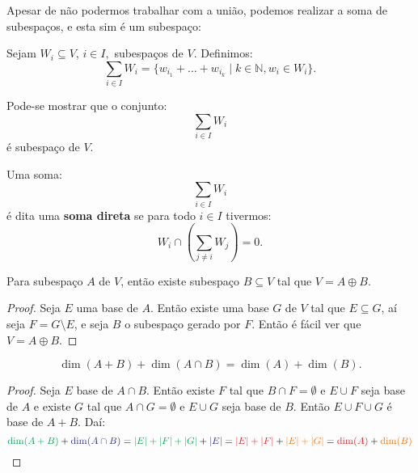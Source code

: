 \documentclass[11pt,twoside,a4paper]{book}
\begin{document}
\noindent
Apesar de não podermos trabalhar com a união, podemos realizar a soma de subespaços, e esta sim é um subespaço:

\begin{definicao}
Sejam $W_i \subseteq V$, $i \in I,$ subespaços de $V.$ Definimos:
\[
\sum\limits_{i \in I} W_i = \{ w_{i_1} + \ldots + w_{i_k} \mid k \in \mathbb{N}, w_i \in W_i \}.
\]
\end{definicao}

\noindent
Pode-se mostrar que o conjunto:
\[
\sum\limits_{i \in I} W_i
\]
é subespaço de $V$.

\begin{definicao}
Uma soma:
\[
\sum\limits_{i \in I} W_i
\]
é dita uma \textbf{soma direta} se para todo $i \in I$ tivermos:
\[
W_i \cap \left( \sum\limits_{j \neq i} W_j \right) = 0.
\]
\end{definicao}

\begin{teorema}
Para subespaço $A$ de $V$, então existe subespaço $B\subseteq V$ tal que $V=A\oplus B$.
\end{teorema}
\begin{proof}
Seja $E$ uma base de $A$. Então existe uma base $G$ de $V$ tal que $E\subseteq G$, aí seja $F=G\setminus E$, e seja $B$ o subespaço gerado por $F$. Então é fácil ver que $V=A\oplus B$.
\end{proof}

\begin{teorema}
\[
\dim(A+B)+\dim(A\cap B)=\dim(A)+\dim(B).
\]
\end{teorema}
\begin{proof}
Seja $E$ base de $A\cap B$. Então existe $F$ tal que $B\cap F=\emptyset$ e $E\cup F$ seja base de $A$ e existe $G$ tal que $A\cap G=\emptyset$ e $E\cup G$ seja base de $B$. Então $E\cup F\cup G$ é base de $A+B$. Daí:
\[
\textcolor{Green}{\dim(A+B)} + \textcolor{Blue}{\dim(A \cap B)} = \textcolor{Green}{\abs{E} + \abs{F} + \abs{G}} + \textcolor{Blue}{\abs{E}} = \textcolor{Red}{\abs{E} + \abs{F}} + \textcolor{Laranja}{\abs{E} + \abs{G}} = \textcolor{Red}{\dim(A)} + \textcolor{Laranja}{\dim(B)}
\]
\end{proof}
\end{document}

